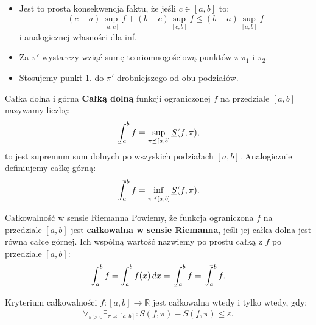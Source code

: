 \documentclass{article}
\newcounter{defi}
\numberwithin{defi}{section}
\numberwithin{defi}{section}
\newcommand{\R}{\mathbb{R}}
\renewcommand{\inf}{\mathop{\mathrm{inf}\vphantom{\mathrm{sup}}}}
\newcommand{\Sd}{\underline{S}}
\newcommand{\Sg}{\overline{S}}
\newcommand{\Cd}{\mkern3mu\underline{\vphantom{\intop}\mkern7mu}\mkern-10mu\int}
\def\Cg{\mathchoice%
{\mkern13mu\overline{\vphantom{\intop}\mkern7mu}\mkern-20mu}%
{\mkern7mu\overline{\vphantom{\intop}\mkern7mu}\mkern-14mu}%
{\mkern7mu\overline{\vphantom{\intop}\mkern7mu}\mkern-14mu}%
{\mkern7mu\overline{\vphantom{\intop}\mkern7mu}\mkern-14mu}%
\int}
\providecommand{\eps}{\varepsilon}
\renewcommand{\leq}{\leqslant}
\newcommand{\tb}[1]{\textbf{#1}}
\begin{document}
\begin{dow}
    \begin{itemize}
        \item Jest to prosta konsekwencja faktu, że jeśli $c \in [a, b]$ to:\begin{equation*}
            (c - a) \sup_{[a, c]} f + (b -c) \sup_{[c, b]} f \leq (b - a) \sup_{[a, b]} f 
        \end{equation*} i analogicznej własności dla inf.
        \item Za $\pi'$ wystarczy wziąć sumę teoriomnogościową punktów z $\pi_1$ i $\pi_2$.
        \item Stosujemy punkt 1. do $\pi'$ drobniejszego od obu podziałów.
    \end{itemize}
\end{dow}


\begin{defr}{Całka dolna i górna}
    \tb{Całką dolną} funkcji ograniczonej $f$ na przedziale $[a, b]$ nazywamy liczbę:\begin{equation}
        \Cd_{a}^{b} f = \sup_{\pi \preceq [a, b]} \Sd(f, \pi), 
    \end{equation} to jest supremum sum dolnych po wszyskich podziałach $[a, b]$. Analogicznie definiujemy całkę górną: \begin{equation}
        \Cg_{a}^{b} f = \inf_{\pi \preceq [a, b]} \Sd(f, \pi).
    \end{equation}
\end{defr}

\begin{defr}{Całkowalność w sensie Riemanna}
    Powiemy, że funkcja ograniczona $f$ na przedziale $[a, b]$ jest \tb{całkowalna w sensie Riemanna}, jeśli jej całka dolna jest równa całce górnej. Ich wspólną wartość nazwiemy po prostu całką z $f$ po przedziale $[a, b]$: \begin{equation}
        \int_{a}^{b} f  = \int_{a}^{b} f(x) \, dx = \Cd_{a}^{b} f = \Cg_{a}^{b} f.
    \end{equation}
\end{defr}

\begin{twier}{Kryterium całkowalności}
    $f: [a, b] \to \R$ jest całkowalna wtedy i tylko wtedy, gdy: \begin{equation}
        \forall_{\eps > 0} \exists_{\pi \preceq [a, b]}: \Sg(f, \pi) - \Sd(f, \pi) \leq \eps.
    \end{equation}
\end{twier}
\end{document}
